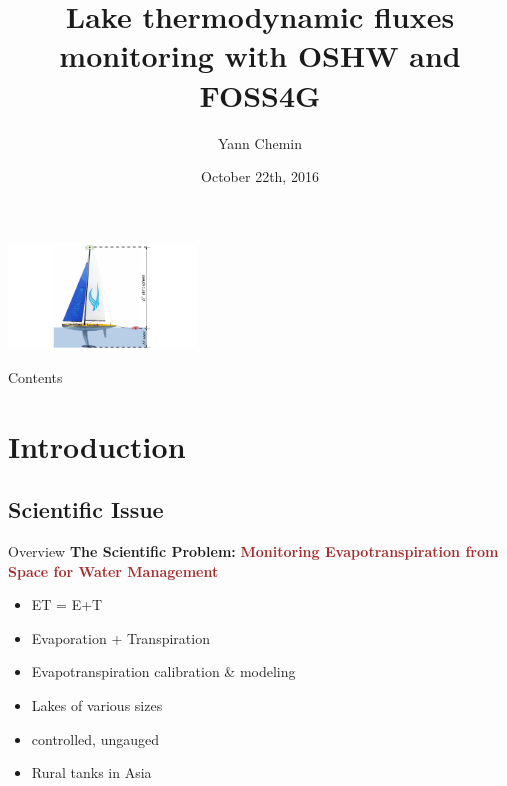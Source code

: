 \documentclass[aspectratio=169,unknownkeysallowed,xcolor=dvipsnames,beamer]{beamer} %
\title[FOSS4G - OSHW]
{Lake thermodynamic fluxes monitoring with OSHW and FOSS4G}
\author{Yann Chemin}
\date{\tiny October 22th, 2016}
\begin{document}
\begin{frame}
\begin{center}
 \includegraphics[width=5cm]{amitomiv1}
\end{center}
 \maketitle
 \end{frame}

\begin{frame}{Contents}
 \begin{multicols}{2}
  \setcounter{tocdepth}{2}  
  \tableofcontents
 \end{multicols} 
\end{frame}

\section{Introduction}
\subsection{Scientific Issue}
\begin{frame}[fragile]{Overview}
\textbf{The Scientific Problem:}
\newline\linebreak
\textbf{\textcolor{brown}{Monitoring Evapotranspiration from Space for Water Management}}
\newline\linebreak 
\begin{itemize}
 \item ET = E+T
 \item Evaporation + Transpiration
 \item Evapotranspiration calibration \& modeling
 \item Lakes of various sizes
 \item controlled, ungauged
 \item Rural tanks in Asia
\end{itemize}
\end{frame}
\end{document}
